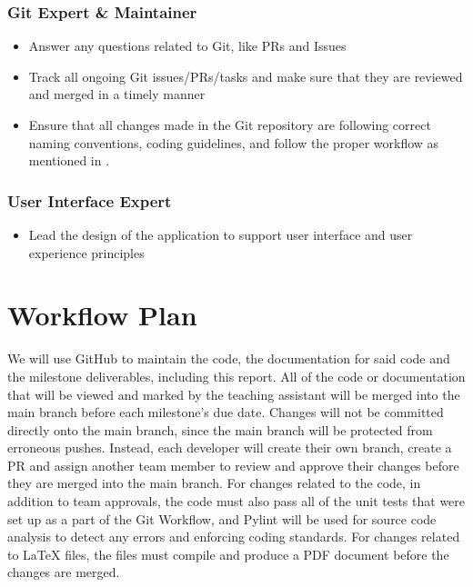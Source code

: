 \documentclass[12pt,letterpaper]{article}
\begin{document}
\subsubsection{Git Expert \& Maintainer}
\begin{itemize}
    \item Answer any questions related to Git, like PRs and Issues
    \item Track all ongoing Git issues/PRs/tasks and make sure that they are
    reviewed and merged in a timely manner
    \item Ensure that all changes made in the Git repository are following
    correct naming conventions, coding guidelines, and follow the proper
    workflow as mentioned in .
\end{itemize}

\subsubsection{User Interface Expert}
\begin{itemize}
    \item Lead the design of the application to support user interface and user
    experience principles
\end{itemize}

\section{Workflow Plan}
\label{workflowPlan}
We will use GitHub to maintain the code, the documentation for said code and the
milestone deliverables, including this report. All of the code or documentation
that will be viewed and marked by the teaching assistant will be merged into the
main branch before each milestone's due date. Changes will not be committed
directly onto the main branch, since the main branch will be protected from
erroneous pushes. Instead, each developer will create their own branch, create a
PR and assign another team member to review and approve their changes before
they are merged into the main branch. For changes related to the code, in
addition to team approvals, the code must also pass all of the unit tests that
were set up as a part of the Git Workflow, and Pylint will be used for source
code analysis to detect any errors and enforcing coding standards. For changes
related to LaTeX files, the files must compile and produce a PDF document before
the changes are merged. 
\end{document}
